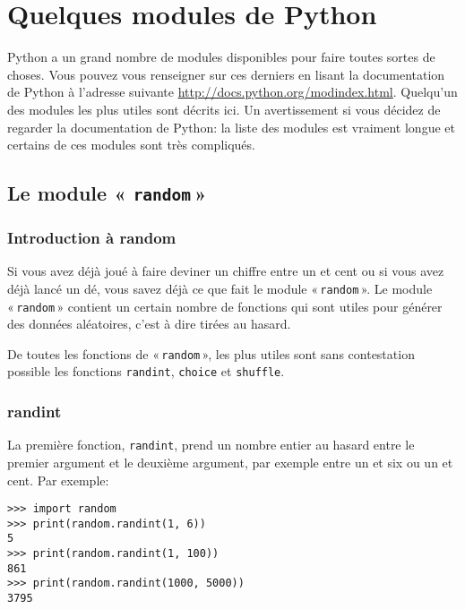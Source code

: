 

\chapter{Quelques modules de Python}\label{app:modules}

Python a un grand nombre de modules disponibles pour faire toutes sortes de choses. Vous pouvez vous renseigner sur ces derniers en lisant la documentation de Python à l'adresse suivante \url{http://docs.python.org/modindex.html}. Quelqu'un des modules les plus utiles sont décrits ici. Un avertissement si vous décidez de regarder la documentation de Python: la liste des modules est vraiment longue et certains de ces modules sont très compliqués.

\section{Le module « \texttt{random} »}
\subsection{Introduction à random}
Si vous avez déjà joué à faire deviner un chiffre entre un et cent ou si vous avez déjà lancé un dé, vous savez déjà ce que fait le module « \texttt{random} ». Le module « \texttt{random} » contient un certain nombre de fonctions qui sont utiles pour générer des données aléatoires, c'est à dire tirées au hasard.

De toutes les fonctions de « \texttt{random} », les plus utiles sont sans contestation possible les fonctions \verb+randint+, \verb+choice+ et \verb+shuffle+. 

\subsection{randint}
La première fonction, \verb+randint+, prend un nombre entier au hasard entre le premier argument et le deuxième argument, par exemple entre un et six ou un et cent. Par exemple:

\begin{Verbatim}[frame=single,rulecolor=\color{gray}]
>>> import random
>>> print(random.randint(1, 6))
5
>>> print(random.randint(1, 100))
861
>>> print(random.randint(1000, 5000))
3795
\end{Verbatim}

